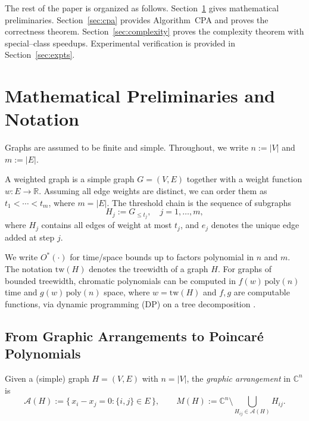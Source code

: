 \documentclass[runningheads]{llncs}
\begin{document}
The rest of the paper is organized as follows. 
Section~\ref{sec:prelim} gives mathematical preliminaries. 
Section~\ref{sec:cpa} provides Algorithm~CPA and proves the correctness theorem. 
Section~\ref{sec:complexity} proves the complexity theorem with special–class 
speedups. Experimental verification is provided in Section~\ref{sec:expts}.
























\section{Mathematical Preliminaries and Notation}
\label{sec:prelim}

Graphs are assumed to be finite and simple. 
Throughout, we write $n := |V|$ and $m := |E|$. 

\begin{definition}
A weighted graph is a simple graph $G=(V,E)$ together with a weight 
function $w : E \to \mathbb{R}$. 
Assuming all edge weights are distinct, we can order them as 
$t_1 < \cdots < t_m$, where $m = |E|$. 
The threshold chain is the sequence of subgraphs
\[
H_j := G_{\le t_j}, \quad j=1,\dots,m,
\]
where $H_j$ contains all edges of weight at most $t_j$, 
and $e_j$ denotes the unique edge added at step $j$.
\end{definition}

We write $O^\ast(\cdot)$ for time/space bounds up to factors polynomial in 
$n$ and $m$. The notation $\mathrm{tw}(H)$ denotes the treewidth of a graph 
$H$. For graphs of bounded treewidth, chromatic polynomials can be computed in 
$f(w)\,\mathrm{poly}(n)$ time and $g(w)\,\mathrm{poly}(n)$ space, where $w=\mathrm{tw}(H)$ 
and $f,g$ are computable functions, via dynamic programming (DP) on a tree 
decomposition \cite{Noble1998,Cygan2015}.

\subsection{From Graphic Arrangements to Poincar\'e Polynomials}

Given a (simple) graph $H=(V,E)$ with $n=|V|$, the \emph{graphic arrangement} in 
$\mathbb{C}^n$ is
\[
\mathcal{A}(H):=\{\,x_i-x_j=0:\{i,j\}\in E\,\}, \qquad 
M(H):=\mathbb{C}^n\setminus \bigcup_{H_{ij}\in\mathcal{A}(H)} H_{ij}.
\]
\end{document}
